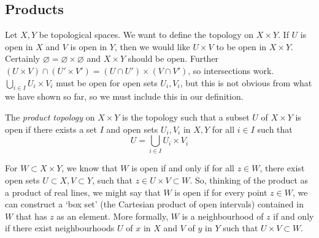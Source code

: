 \subsection{Products}
Let \( X, Y \) be topological spaces.
We want to define the topology on \( X \times Y \).
If \( U \) is open in \( X \) and \( V \) is open in \( Y \), then we would like \( U \times V \) to be open in \( X \times Y \).
Certainly \( \varnothing = \varnothing \times \varnothing \) and \( X \times Y \) should be open.
Further \( (U \times V) \cap (U' \times V') = (U \cap U') \times (V \cap V') \), so intersections work.
\( \bigcup_{i \in I} U_i \times V_i \) must be open for open sets \( U_i, V_i \), but this is not obvious from what we have shown so far, so we must include this in our definition.
\begin{definition}
	The \textit{product topology} on \( X \times Y \) is the topology such that a subset \( U \) of \( X \times Y \) is open if there exists a set \( I \) and open sets \( U_i, V_i \) in \( X, Y \) for all \( i \in I \) such that
	\[
		U = \bigcup_{i \in I} U_i \times V_i
	\]
\end{definition}
\begin{remark}
	For \( W \subset X \times Y \), we know that \( W \) is open if and only if for all \( z \in W \), there exist open sets \( U \subset X, V \subset Y \), such that \( z \in U \times V \subset W \).
	So, thinking of the product as a product of real lines, we might say that \( W \) is open if for every point \( z \in W \), we can construct a `box set' (the Cartesian product of open intervals) contained in \( W \) that has \( z \) as an element.
	More formally, \( W \) is a neighbourhood of \( z \) if and only if there exist neighbourhoods \( U \) of \( x \) in \( X \) and \( V \) of \( y \) in \( Y \) such that \( U \times V \subset W \).
\end{remark}

